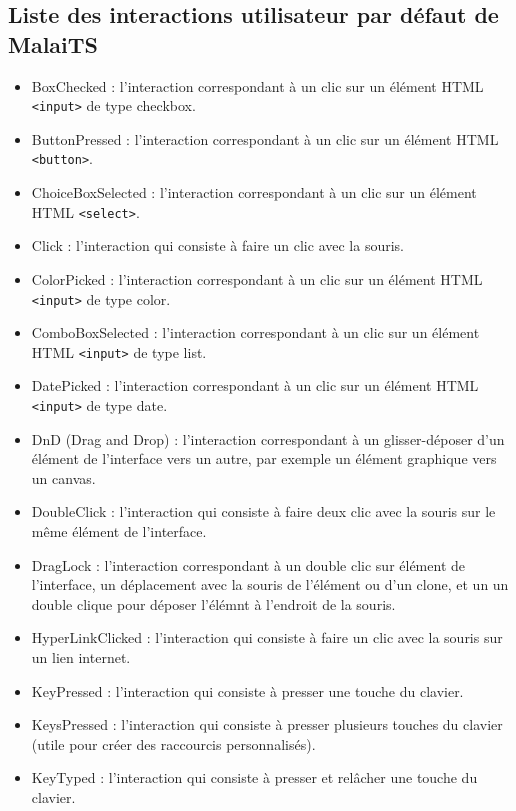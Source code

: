 \documentclass[11pt, a4paper, pdftex]{article}
\newcommand{\info}{\texttt}
\begin{document}
\begin{appendices}
        \newpage
        \section{Liste des interactions utilisateur par défaut de MalaiTS}\label{sec:listint}
            \begin{itemize}
                \item BoxChecked : l'interaction correspondant à un clic sur un élément HTML \info{<input>} de type checkbox.
                \item ButtonPressed : l'interaction correspondant à un clic sur un élément HTML \info{<button>}.
                \item ChoiceBoxSelected : l'interaction correspondant à un clic sur un élément HTML \info{<select>}.
                \item Click : l'interaction qui consiste à faire un clic avec la souris.
                \item ColorPicked : l'interaction correspondant à un clic sur un élément HTML \info{<input>} de type color.
                \item ComboBoxSelected : l'interaction correspondant à un clic sur un élément HTML \info{<input>} de type list.
                \item DatePicked : l'interaction correspondant à un clic sur un élément HTML \info{<input>} de type date.
                \item DnD (Drag and Drop) : l'interaction correspondant à un glisser-déposer d'un élément de l'interface vers un autre, par exemple un élément graphique vers un canvas.
                \item DoubleClick : l'interaction qui consiste à faire deux clic avec la souris sur le même élément de l'interface.
                \item DragLock : l'interaction correspondant à un double clic sur élément de l'interface, un déplacement avec la souris de l'élément ou d'un clone, et un un double clique pour déposer l'élémnt à l'endroit de la souris.
                \item HyperLinkClicked : l'interaction qui consiste à faire un clic avec la souris sur un lien internet.
                \item KeyPressed : l'interaction qui consiste à presser une touche du clavier.
                \item KeysPressed : l'interaction qui consiste à presser plusieurs touches du clavier (utile pour créer des raccourcis personnalisés).
                \item KeyTyped : l'interaction qui consiste à presser et relâcher une touche du clavier.

\end{itemize}
\end{appendices}
\end{document}
